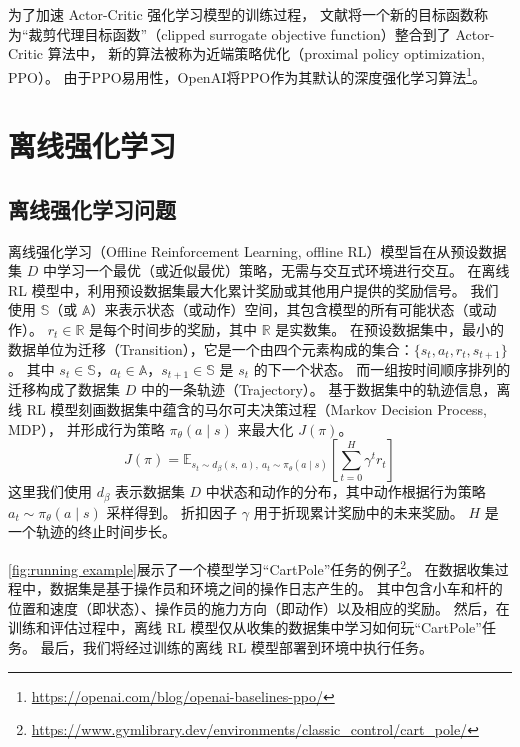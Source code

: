 为了加速 Actor-Critic 强化学习模型的训练过程\cite{SLAJM15}，
文献{\rm\parencite{SWDRK17,HTSLMWTEWERS17}}将一个新的目标函数称为“裁剪代理目标函数”（clipped surrogate objective function）整合到了 Actor-Critic 算法中，
新的算法被称为近端策略优化（proximal policy optimization, PPO）。
由于PPO易用性，OpenAI将PPO作为其默认的深度强化学习算法\footnote{\url{https://openai.com/blog/openai-baselines-ppo/}}。


\section{离线强化学习}


\subsection{离线强化学习问题}
\label{sec:Offline Reinforcement Learning Problem}
离线强化学习（Offline Reinforcement Learning, offline RL）模型旨在从预设数据集 $D$ 中学习一个最优（或近似最优）策略，无需与交互式环境进行交互。
在离线 RL 模型中，利用预设数据集最大化累计奖励或其他用户提供的奖励信号。
我们使用 $\mathbb{S}$（或 $\mathbb{A}$）来表示状态（或动作）空间，其包含模型的所有可能状态（或动作）。
$r_t \in \mathbb{R}$ 是每个时间步的奖励，其中 $\mathbb{R}$ 是实数集。
在预设数据集中，最小的数据单位为迁移（Transition），它是一个由四个元素构成的集合：$\{s_t, a_t, r_t, s_{t+1}\}$。
其中 $s_t \in \mathbb{S}$，$a_t \in \mathbb{A}$，$s_{t+1} \in \mathbb{S}$ 是 $s_t$ 的下一个状态。
而一组按时间顺序排列的迁移构成了数据集 $D$ 中的一条轨迹（Trajectory）。
基于数据集中的轨迹信息，离线 RL 模型刻画数据集中蕴含的马尔可夫决策过程（Markov Decision Process, MDP），
并形成行为策略 $\pi_\theta(a\mid{s})$ 来最大化 $J(\pi)$。
\begin{equation}
    J(\pi)=\mathbb{E}_{{s_t} \sim d_{\beta}({s,~a}),~{a_t} \sim \pi_\theta({a} \mid {s})}\left[\sum_{t=0}^{{H}} \gamma^{t} r_t\right]
\end{equation}
这里我们使用 $d_{\beta}$ 表示数据集 $D$ 中状态和动作的分布，其中动作根据行为策略 ${a_t}\sim \pi_\theta(a\mid{s})$ 采样得到。
折扣因子 $\gamma$ 用于折现累计奖励中的未来奖励。
$H$ 是一个轨迹的终止时间步长。

\autoref{fig:running example}展示了一个模型学习“CartPole”任务的例子\footnote{\url{https://www.gymlibrary.dev/environments/classic_control/cart_pole/}}。
在数据收集过程中，数据集是基于操作员和环境之间的操作日志产生的。
其中包含小车和杆的位置和速度（即状态）、操作员的施力方向（即动作）以及相应的奖励。
然后，在训练和评估过程中，离线 RL 模型仅从收集的数据集中学习如何玩“CartPole”任务。
最后，我们将经过训练的离线 RL 模型部署到环境中执行任务。

